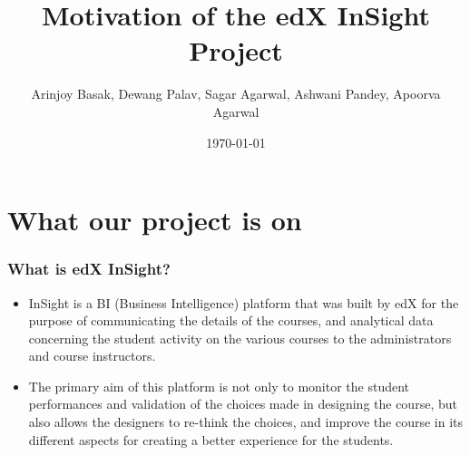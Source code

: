 \documentclass[12pt,xcolor=dvipsnames]{beamer}
\title{Motivation of the edX InSight Project}
\author{Arinjoy Basak, Dewang Palav, Sagar Agarwal, Ashwani Pandey, Apoorva Agarwal}
\date{\today}
\begin{document}
\begin{frame}
\titlepage
\end{frame}



\section{What our project is on}
\begin{frame}[t]
\frametitle{What is edX InSight?}

\begin{itemize}
\item InSight is a BI (Business Intelligence) platform that was built by edX for the purpose of communicating
the details of the courses, and analytical data concerning the student activity on the various courses to
the administrators and course instructors.\\

\item The primary aim of this platform is not only to monitor the
student performances and validation of the choices made in designing the course, but also allows the
designers to re-think the choices, and improve the course in its different aspects for creating a better
experience for the students.
\end{itemize}




\end{frame}
\end{document}
